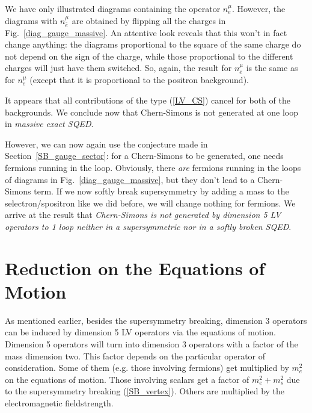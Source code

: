 \documentclass[a4paper,12pt]{article}
\begin{document}
        We have only illustrated diagrams containing the operator 
$ n_e^\mu $.
        However, the diagrams with 
$ n_{\bar{e}}^\mu $
	are obtained by flipping all the charges in 
Fig.~\ref{diag_gauge_massive}.
        An attentive look reveals that this won't in fact change 
	anything: 
	the diagrams proportional to the square of the same charge
	do not depend on the sign of the charge, 
	while those proportional to the different charges will
	just have them switched.
	So, again, the result for 
$ n_{\bar{e}}^\mu $
	is the same as for
$ n_e^\mu $
	(except that it is proportional to the positron background).

	It appears that all contributions of the type
	(\ref{LV_CS}) cancel for both of the backgrounds. 
	We conclude now that Chern-Simons is not generated at one loop
	in {\it massive exact SQED}.

	However, we can now again use the conjecture made
	in Section~\ref{SB_gauge_sector}: for a Chern-Simons to be
	generated, one needs fermions running in the loop. 
	Obviously, there {\it are} fermions running in the loops
	of diagrams in 
Fig.~\ref{diag_gauge_massive}, 
	but they don't lead to a Chern-Simons term.
	If we now softly break supersymmetry by adding a mass
	to the selectron/spositron like we did before, 
	we will change nothing for fermions.
	We arrive at the result that {\it Chern-Simons is not generated
	by dimension 5 LV operators 
	to 1 loop neither in a supersymmetric nor in a softly
	broken SQED}.


\section{Reduction on the Equations of Motion}
\label{Reduction}

	As mentioned earlier, besides the supersymmetry breaking, 
	dimension 3 operators can be induced by dimension 5 LV 
	operators via the equations of motion.
	Dimension 5 operators will turn into dimension 3 operators 
	with a factor of the mass dimension two.
	This factor depends on the particular operator of consideration.
	Some of them (e.g. those involving fermions) 
	get multiplied by $ m_e^2 $ on the equations of motion.
	Those involving scalars get a factor of
	$ m_e^2 + m_s^2 $
	due to the supersymmetry breaking (\ref{SB_vertex}).
	Others are multiplied by the electromagnetic fieldstrength.
	
\end{document}
